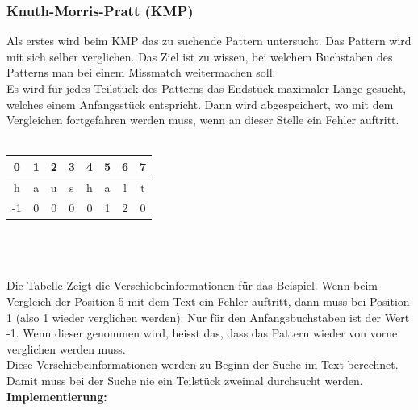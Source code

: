 \documentclass[a4paper,10pt]{article}
\newcommand{\Bold}[1]{\textbf{#1}} %
\begin{document}
\subsubsection{Knuth-Morris-Pratt (KMP)}
Als erstes wird beim KMP das zu suchende Pattern untersucht. Das Pattern wird mit sich selber verglichen. Das Ziel ist zu wissen, bei welchem Buchstaben des Patterns man bei einem Missmatch weitermachen soll. \\
Es wird f\"ur jedes Teilst\"uck des Patterns das Endst\"uck maximaler L\"ange gesucht, welches einem Anfangsst\"uck entspricht. Dann wird abgespeichert, wo mit dem Vergleichen fortgefahren werden muss, wenn an dieser Stelle ein Fehler auftritt. \\ \\
\begin{tabular}{|c|c|c|c|c|c|c|c|}
	\hline 
	0 & 1 & 2 & 3 & 4 & 5 & 6 & 7 \\
	\hline
	h & a & u & s & h & a & l & t \\
	\hline
	-1 & 0 & 0 & 0 & 0 & 1 & 2 & 0 \\
	\hline
\end{tabular} \\ \\ \\
Die Tabelle Zeigt die Verschiebeinformationen f\"ur das Beispiel. Wenn beim Vergleich der Position 5 mit dem Text ein Fehler auftritt, dann muss bei Position 1 (also 1 wieder verglichen werden). Nur f\"ur den Anfangsbuchstaben ist der Wert -1. Wenn dieser genommen wird, heisst das, dass das Pattern wieder von vorne verglichen werden muss. \\
Diese Verschiebeinformationen werden zu Beginn der Suche im Text berechnet. Damit muss bei der Suche nie ein Teilst\"uck zweimal durchsucht werden. \\

\Bold{Implementierung:}
\end{document}
